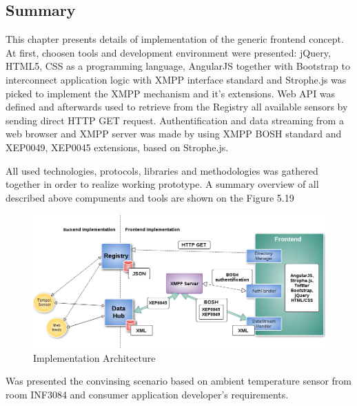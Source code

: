 \subsection{Summary}
This chapter presents details of implementation of the generic frontend concept. At first, choosen tools and development environment were presented: jQuery, HTML5, CSS as a programming language, AngularJS together with Bootstrap to interconnect application logic with XMPP interface standard and Strophe.js was picked to implement the XMPP mechanism and it's extensions. Web API was defined and afterwards used to retrieve from the Registry all available sensors by sending direct HTTP GET request. Authentification and data streaming from a web browser and XMPP server was made by using XMPP BOSH standard and XEP0049, XEP0045 extensions, based on Strophe.js. 

All used technologies, protocols, libraries and methodologies was gathered together in order to realize working prototype. A summary overview of all described above compunents and tools are shown on the Figure 5.19
\begin{figure}[!ht]
\centering
\includegraphics[scale=0.5]{images/ch5Summary.png}   
\caption[Implementation Architecture]{Implementation Architecture}                         
\end{figure}
Was presented the convinsing scenario based on ambient temperature sensor from room INF3084 and consumer application developer's requirements. 
